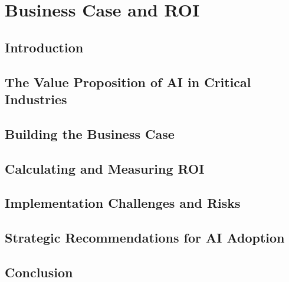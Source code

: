 \chapter{Business Case and ROI}
\label{chap:business_case_and_roi}

\section{Introduction}
\label{sec:business_case_introduction}

\section{The Value Proposition of AI in Critical Industries}
\label{sec:value_proposition}

\section{Building the Business Case}
\label{sec:building_business_case}

\section{Calculating and Measuring ROI}
\label{sec:calculating_roi}

\section{Implementation Challenges and Risks}
\label{sec:implementation_challenges}

\section{Strategic Recommendations for AI Adoption}
\label{sec:strategic_recommendations}

\section{Conclusion}
\label{sec:business_case_conclusion}